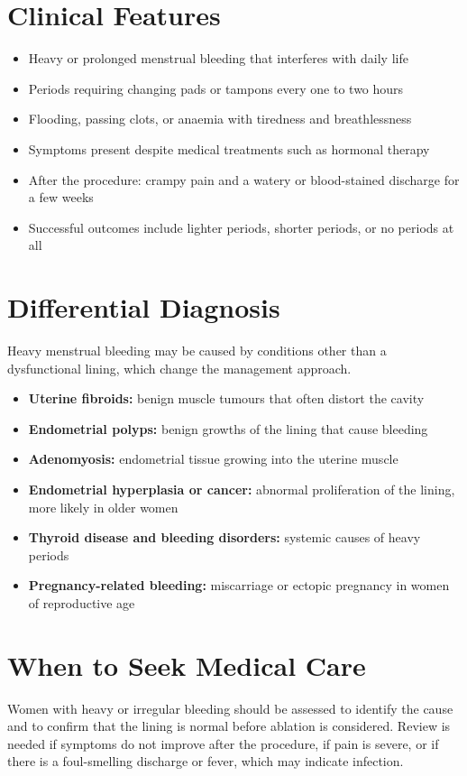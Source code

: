 \section*{Clinical Features}
\begin{itemize}
    \item Heavy or prolonged menstrual bleeding that interferes with daily life
    \item Periods requiring changing pads or tampons every one to two hours
    \item Flooding, passing clots, or anaemia with tiredness and breathlessness
    \item Symptoms present despite medical treatments such as hormonal therapy
    \item After the procedure: crampy pain and a watery or blood-stained discharge for a few weeks
    \item Successful outcomes include lighter periods, shorter periods, or no periods at all
\end{itemize}

\section*{Differential Diagnosis}
Heavy menstrual bleeding may be caused by conditions other than a dysfunctional lining, which change the management approach.
\begin{itemize}
    \item \textbf{Uterine fibroids:} benign muscle tumours that often distort the cavity
    \item \textbf{Endometrial polyps:} benign growths of the lining that cause bleeding
    \item \textbf{Adenomyosis:} endometrial tissue growing into the uterine muscle
    \item \textbf{Endometrial hyperplasia or cancer:} abnormal proliferation of the lining, more likely in older women
    \item \textbf{Thyroid disease and bleeding disorders:} systemic causes of heavy periods
    \item \textbf{Pregnancy-related bleeding:} miscarriage or ectopic pregnancy in women of reproductive age
\end{itemize}

\section*{When to Seek Medical Care}
Women with heavy or irregular bleeding should be assessed to identify the cause and to confirm that the lining is normal before ablation is considered. Review is needed if symptoms do not improve after the procedure, if pain is severe, or if there is a foul-smelling discharge or fever, which may indicate infection.

